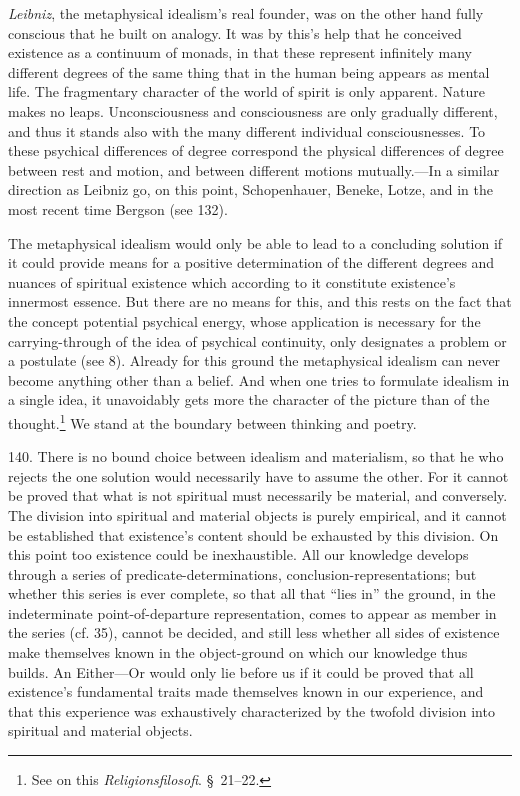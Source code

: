 \documentclass[12pt,a4paper]{book}
\newcommand{\opage}[1]{\marginnote{\footnotesize\textit{[#1]}}}
\begin{document}
\emph{Leibniz}, the metaphysical idealism's real founder, was on the other hand fully conscious that
he built on analogy. It was by this's help that he conceived \opage{334}existence as a continuum of monads, in
that these represent infinitely many different degrees of the same thing that in the human being
appears as mental life. The fragmentary character of the world of spirit is only apparent. Nature
makes no leaps. Unconsciousness and consciousness are only gradually different, and thus it stands
also with the many different individual consciousnesses. To these psychical differences of degree
correspond the physical differences of degree between rest and motion, and between different motions
mutually.---In a similar direction as Leibniz go, on this point, Schopenhauer, Beneke, Lotze, and in
the most recent time Bergson (see 132).

The metaphysical idealism would only be able to lead to a concluding solution if it could provide
means for a positive determination of the different degrees and nuances of spiritual existence which
according to it constitute existence's innermost essence. But there are no means for this, and this
rests on the fact that the concept potential psychical energy, whose application is necessary for the
carrying-through of the idea of psychical continuity, only designates a problem or a postulate (see
8). Already for this ground the metaphysical idealism can never become anything other than a belief.
And when one tries to formulate idealism in a single idea, it unavoidably gets more the character of
the picture than of the thought.\footnote{See on this \emph{Religionsfilosofi}. \S\ 21--22.} We stand
at the boundary between thinking and poetry.

140. There is no bound choice between idealism and materialism, so that he who rejects the one
solution would necessarily have to assume the other. For it cannot be proved that what is not
spiritual must necessarily be material, and conversely. The division into spiritual and material
objects is purely empirical, and it cannot be established that existence's content should be exhausted
by this division. On this point too existence could be inexhaustible. All our knowledge develops
through a series of predicate-determinations, conclusion-representations; but whether this series is
ever complete, so that all that ``\opage{335}lies in'' the ground, in the indeterminate point-of-departure
representation, comes to appear as member in the series (cf. 35), cannot be decided, and still less
whether all sides of existence make themselves known in the object-ground on which our knowledge thus
builds. An Either---Or would only lie before us if it could be proved that all existence's fundamental
traits made themselves known in our experience, and that this experience was exhaustively characterized
by the twofold division into spiritual and material objects.
\end{document}
